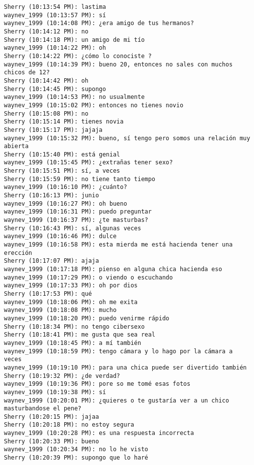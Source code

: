 \begin{verbatim}
Sherry (10:13:54 PM): lastima
waynev_1999 (10:13:57 PM): sí
waynev_1999 (10:14:08 PM): ¿era amigo de tus hermanos?
Sherry (10:14:12 PM): no
Sherry (10:14:18 PM): un amigo de mi tío
waynev_1999 (10:14:22 PM): oh 
Sherry (10:14:22 PM): ¿cómo lo conociste ?
waynev_1999 (10:14:39 PM): bueno 20, entonces no sales con muchos chicos de 12?
Sherry (10:14:42 PM): oh
Sherry (10:14:45 PM): supongo
waynev_1999 (10:14:53 PM): no usualmente
waynev_1999 (10:15:02 PM): entonces no tienes novio
Sherry (10:15:08 PM): no
Sherry (10:15:14 PM): tienes novia 
Sherry (10:15:17 PM): jajaja
waynev_1999 (10:15:32 PM): bueno, sí tengo pero somos una relación muy abierta
Sherry (10:15:40 PM): está genial
waynev_1999 (10:15:45 PM): ¿extrañas tener sexo?
Sherry (10:15:51 PM): sí, a veces
Sherry (10:15:59 PM): no tiene tanto tiempo
waynev_1999 (10:16:10 PM): ¿cuánto?
Sherry (10:16:13 PM): junio
waynev_1999 (10:16:27 PM): oh bueno
waynev_1999 (10:16:31 PM): puedo preguntar
waynev_1999 (10:16:37 PM): ¿te masturbas?
Sherry (10:16:43 PM): sí, algunas veces
waynev_1999 (10:16:46 PM): dulce
waynev_1999 (10:16:58 PM): esta mierda me está hacienda tener una erección
Sherry (10:17:07 PM): ajaja
waynev_1999 (10:17:18 PM): pienso en alguna chica hacienda eso
waynev_1999 (10:17:29 PM): o viendo o escuchando
waynev_1999 (10:17:33 PM): oh por dios
Sherry (10:17:53 PM): qué
waynev_1999 (10:18:06 PM): oh me exita
waynev_1999 (10:18:08 PM): mucho
waynev_1999 (10:18:20 PM): puedo venirme rápido
Sherry (10:18:34 PM): no tengo cibersexo
Sherry (10:18:41 PM): me gusta que sea real
waynev_1999 (10:18:45 PM): a mí también
waynev_1999 (10:18:59 PM): tengo cámara y lo hago por la cámara a veces
waynev_1999 (10:19:10 PM): para una chica puede ser divertido también
Sherry (10:19:32 PM): ¿de verdad?
waynev_1999 (10:19:36 PM): pore so me tomé esas fotos
waynev_1999 (10:19:38 PM): sí
waynev_1999 (10:20:01 PM): ¿quieres o te gustaría ver a un chico masturbandose el pene?
Sherry (10:20:15 PM): jajaa
Sherry (10:20:18 PM): no estoy segura
waynev_1999 (10:20:28 PM): es una respuesta incorrecta
Sherry (10:20:33 PM): bueno
waynev_1999 (10:20:34 PM): no lo he visto
Sherry (10:20:39 PM): supongo que lo haré
\end{verbatim}